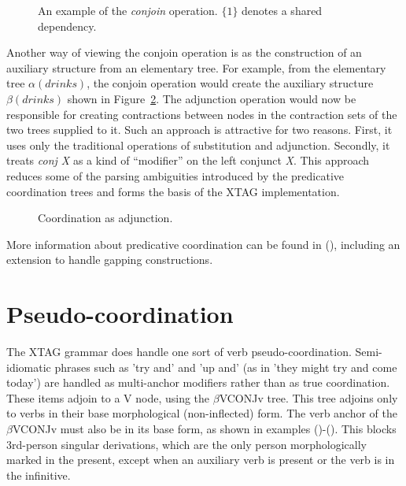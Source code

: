 
\begin{figure}[htbp]
  \begin{center}
    \leavevmode
  \end{center}
  \caption{An example of the {\em conjoin\/} operation. $\{1\}$
    denotes a shared dependency.}
  \label{fig:vpc}
\end{figure}

Another way of viewing the conjoin operation is as the construction of
an auxiliary structure from an elementary tree. For example, from the
elementary tree $\alpha(drinks)$, the conjoin operation would create
the auxiliary structure $\beta(drinks)$ shown in
Figure~\ref{fig:aux-conj}. The adjunction operation would now be
responsible for creating contractions between nodes in the contraction
sets of the two trees supplied to it. Such an approach is attractive
for two reasons. First, it uses only the traditional operations of
substitution and adjunction. Secondly, it treats {\em conj X} as a
kind of ``modifier'' on the left conjunct {\em X}. This approach
reduces some of the parsing ambiguities introduced by the predicative
coordination trees and forms the basis of the XTAG implementation.

\begin{figure}[htbp]
  \begin{center}
    \leavevmode
  \end{center}
  \caption{Coordination as adjunction.}
  \label{fig:aux-conj}
\end{figure}

More information about predicative coordination can be found in
(\cite{anoopjoshi96}), including an extension to handle gapping constructions.

\section{Pseudo-coordination}

The XTAG grammar does handle one sort of verb pseudo-coordination. 
Semi-idiomatic phrases such as 'try and' and 'up and' (as in 'they might 
try and come today') are handled as multi-anchor modifiers 
rather than as true coordination. These items adjoin to a V node, using 
the $\beta$VCONJv tree. This tree adjoins only to verbs in their base 
morphological (non-inflected) form. The verb anchor of the $\beta$VCONJv 
must also be in its base form, as shown in examples 
()-(). This blocks 3rd-person singular derivations, 
which are the only person morphologically marked in the present, except when 
an auxiliary verb is present or the verb is in the infinitive.

